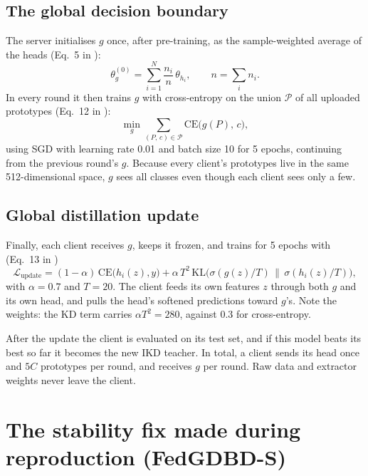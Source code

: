 \subsection{The global decision boundary}
The server initialises $g$ once, after pre-training, as the sample-weighted average of the heads (Eq.~5 in \cite{zhang2025gdbd}):
\begin{equation}
\theta_g^{(0)} = \sum_{i=1}^{N} \frac{n_i}{n}\, \theta_{h_i}, \qquad n = \sum_i n_i .
\label{eq:ginit}
\end{equation}
In every round it then trains $g$ with cross-entropy on the union $\mathcal{P}$ of all uploaded prototypes (Eq.~12 in \cite{zhang2025gdbd}):
\begin{equation}
\min_{g} \sum_{(P,\,c) \in \mathcal{P}} \mathrm{CE}\big(g(P),\, c\big),
\label{eq:gtrain}
\end{equation}
using SGD with learning rate 0.01 and batch size 10 for 5 epochs, continuing from the previous round's $g$. Because every client's prototypes live in the same 512-dimensional space, $g$ sees all classes even though each client sees only a few.

\subsection{Global distillation update}
Finally, each client receives $g$, keeps it frozen, and trains for 5 epochs with (Eq.~13 in \cite{zhang2025gdbd})
\begin{equation}
\mathcal{L}_{\text{update}} = (1-\alpha)\,\mathrm{CE}\big(h_i(z), y\big) + \alpha\, T^2\, \mathrm{KL}\big(\sigma(g(z)/T) \,\big\|\, \sigma(h_i(z)/T)\big),
\label{eq:update}
\end{equation}
with $\alpha = 0.7$ and $T = 20$. The client feeds its own features $z$ through both $g$ and its own head, and pulls the head's softened predictions toward $g$'s. Note the weights: the KD term carries $\alpha T^2 = 280$, against $0.3$ for cross-entropy.

After the update the client is evaluated on its test set, and if this model beats its best so far it becomes the new IKD teacher. In total, a client sends its head once and $5C$ prototypes per round, and receives $g$ per round. Raw data and extractor weights never leave the client.

\section{The stability fix made during reproduction (FedGDBD-S)}
\label{sec:m-fix}

